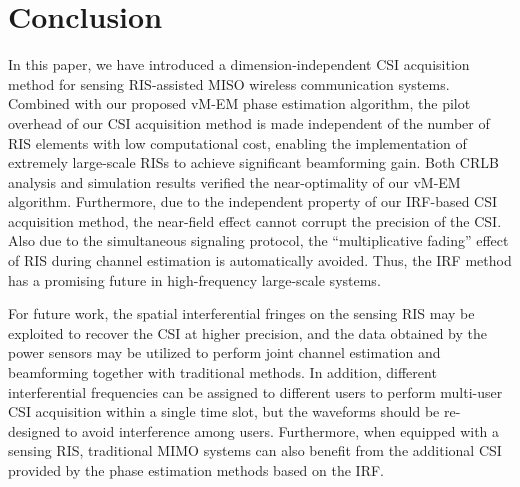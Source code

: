 \documentclass[journal,twocolumn]{IEEEtran}
\theoremstyle{nonumberplain}
\begin{document}
\section{Conclusion}
\label{Conclusion}
    In this paper, we have introduced a dimension-independent CSI acquisition method for sensing RIS-assisted MISO wireless communication systems. 
    Combined with our proposed vM-EM phase estimation algorithm, the pilot overhead of our CSI acquisition method is made independent of the number of RIS elements with low computational cost, enabling the implementation of extremely large-scale RISs to achieve significant beamforming gain. 
    Both CRLB analysis and simulation results verified the near-optimality of our vM-EM algorithm. 
    Furthermore, due to the independent property of our \ac{IRF}-based CSI acquisition method, the near-field effect cannot corrupt the precision of the CSI. 
    Also due to the simultaneous signaling protocol, the ``multiplicative fading'' effect of RIS \cite{zhang2021active,liu2021active} during channel estimation is automatically avoided. 
    Thus, the \ac{IRF} method has a promising future in high-frequency large-scale systems. 
    
    For future work, the spatial interferential fringes on the sensing RIS may be exploited to recover the CSI at higher precision, and the data obtained by the power sensors may be utilized to perform joint channel estimation and beamforming together with traditional methods. 
    In addition, different interferential frequencies can be assigned to different users to perform multi-user CSI acquisition within a single time slot, but the waveforms should be re-designed to avoid interference among users. 
    Furthermore, when equipped with a sensing RIS, traditional MIMO systems can also benefit from the additional CSI provided by the phase estimation methods based on the IRF.  

\appendices
\end{document}
